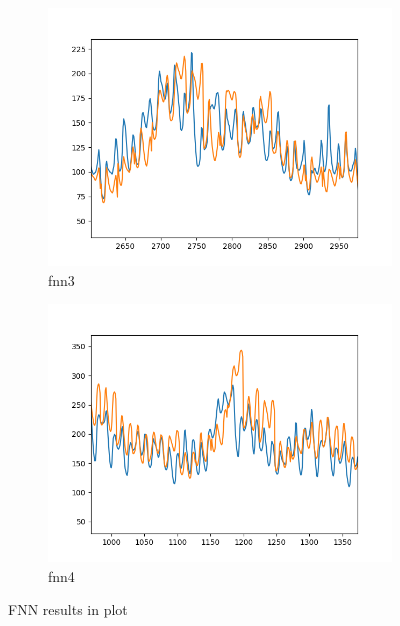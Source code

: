 \begin{figure}
\begin{subfigure}[b]{0.55\textwidth}
        \includegraphics[width=\textwidth]{../Figures/fnn-3.png}
        \caption{fnn3}
        \label{fig:fnn3}
    \end{subfigure}
    \hfill
    \begin{subfigure}[b]{0.55\textwidth}
        \centering
        \includegraphics[width=\textwidth]{../Figures/fnn-4.png}
        \caption{fnn4}
        \label{fig:fnn4}
    \end{subfigure}
       \caption{FNN results in plot}
       \label{fig:fnn}
\end{figure}


